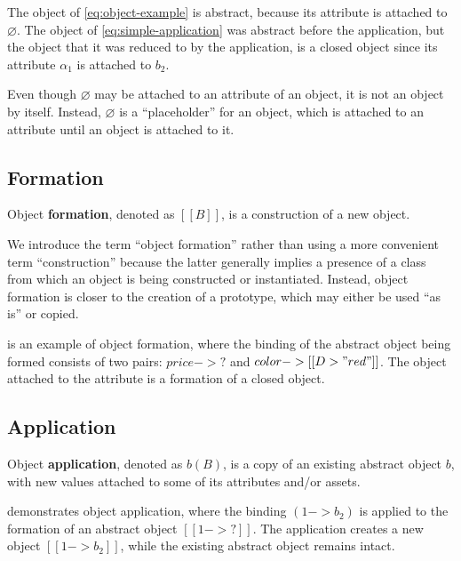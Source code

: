 The object of \cref{eq:object-example} is abstract, because its attribute  is attached to \(\varnothing\). The object of \cref{eq:simple-application} was abstract before the application, but the object that it was reduced to by the application, is a closed object since its attribute \(\alpha_1\) is attached to \(b_2\).

Even though \(\varnothing\) may be attached to an attribute of an object, it is not an object by itself. Instead, \(\varnothing\) is a ``placeholder'' for an object, which is attached to an attribute until an object is attached to it.

\subsection{Formation}

\begin{definition}[Formation]
Object \textbf{formation}, denoted as $[[B]]$, is a construction of a new object.
\end{definition}

We introduce the term ``object formation'' rather than using a more convenient
term ``construction'' because the latter generally implies a presence of a
class from which an object is being constructed or instantiated. Instead,
object formation is closer to the creation of a prototype, which may either be
used ``as is'' or copied.

 is an example of object formation, where the binding of
the abstract object being formed consists of two pairs: $price -> ?$ and
$color -> [[D>"red"]]$. The object attached to the  attribute is a
formation of a closed object.

\subsection{Application}

\begin{definition}[Application]
Object \textbf{application}, denoted as $b(B)$, is a copy of an existing abstract object \(b\), with new values attached to some of its attributes and/or assets.
\end{definition}

 demonstrates object application, where the binding $( 1-> b_2 )$ is applied to the formation of an abstract object $[[ 1-> ?]]$. The application creates a new object $[[ 1-> b_2 ]]$, while the existing abstract object remains intact.

